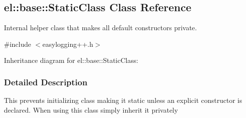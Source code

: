 \hypertarget{a00084}{}\subsection{el\+:\+:base\+:\+:Static\+Class Class Reference}
\label{a00084}


Internal helper class that makes all default constructors private.  




{\ttfamily \#include $<$easylogging++.\+h$>$}



Inheritance diagram for el\+:\+:base\+:\+:Static\+Class\+:


\subsubsection{Detailed Description}
This prevents initializing class making it static unless an explicit constructor is declared. When using this class simply inherit it privately 